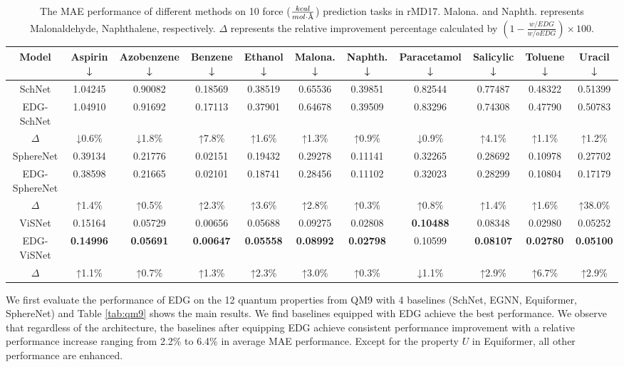 \documentclass{article}
\begin{document}
\begin{table}[h]
  \scriptsize
  \centering
    \begin{tabular}{ccccccccccc}
    \toprule
    Model & Aspirin ↓ & Azobenzene ↓ & Benzene ↓ & Ethanol ↓ & Malona. ↓ & Naphth. ↓ & Paracetamol ↓ & Salicylic ↓ & Toluene ↓ & Uracil ↓ \\
    \midrule
    SchNet & 1.04245  & 0.90082  & 0.18569  & 0.38519  & 0.65536  & 0.39851  & 0.82544  & 0.77487  & 0.48322  & 0.51399  \\
    EDG-SchNet & 1.04910  & 0.91692  & 0.17113  & 0.37901  & 0.64678  & 0.39509  & 0.83296  & 0.74308  & 0.47790  & 0.50783  \\
    $\Delta$ & ↓0.6\% & ↓1.8\% & ↑7.8\% & ↑1.6\% & ↑1.3\% & ↑0.9\% & ↓0.9\% & ↑4.1\% & ↑1.1\% & ↑1.2\% \\
    \midrule
    SphereNet & 0.39134  & 0.21776  & 0.02151  & 0.19432  & 0.29278  & 0.11141  & 0.32265  & 0.28692  & 0.10978  & 0.27702  \\
    EDG-SphereNet & 0.38598  & 0.21665  & 0.02101  & 0.18741  & 0.28456  & 0.11102  & 0.32023  & 0.28299  & 0.10804  & 0.17179  \\
    $\Delta$ & ↑1.4\% & ↑0.5\% & ↑2.3\% & ↑3.6\% & ↑2.8\% & ↑0.3\% & ↑0.8\% & ↑1.4\% & ↑1.6\% & ↑38.0\% \\
    \midrule
    ViSNet & 0.15164  & 0.05729  & 0.00656  & 0.05688  & 0.09275  & 0.02808  & \textbf{0.10488 } & 0.08348  & 0.02980  & 0.05252  \\
    EDG-ViSNet & \textbf{0.14996 } & \textbf{0.05691 } & \textbf{0.00647 } & \textbf{0.05558 } & \textbf{0.08992 } & \textbf{0.02798 } & 0.10599  & \textbf{0.08107 } & \textbf{0.02780 } & \textbf{0.05100 } \\
    $\Delta$ & ↑1.1\% & ↑0.7\% & ↑1.3\% & ↑2.3\% & ↑3.0\% & ↑0.3\% & ↓1.1\% & ↑2.9\% & ↑6.7\% & ↑2.9\% \\
    \bottomrule
    \end{tabular}
  \caption{The MAE performance of different methods on 10 force ($\frac{kcal}{mol\cdot \text{\r{A}}}$) prediction tasks in rMD17. Malona. and Naphth. represents Malonaldehyde, Naphthalene, respectively. $\Delta$ represents the relative improvement percentage calculated by $(1-\frac{w/ EDG}{w/o EDG})\times 100$.}
  \label{tab:rmd17_force}
\end{table}


We first evaluate the performance of EDG on the 12 quantum properties from QM9 with 4 baselines (SchNet, EGNN, Equiformer, SphereNet) and Table \ref{tab:qm9} shows the main results. We find baselines equipped with EDG achieve the best performance. We observe that regardless of the architecture, the baselines after equipping EDG achieve consistent performance improvement with a relative performance increase ranging from 2.2\% to 6.4\% in average MAE performance. Except for the property $U$ in Equiformer, all other performance are enhanced.
\end{document}
